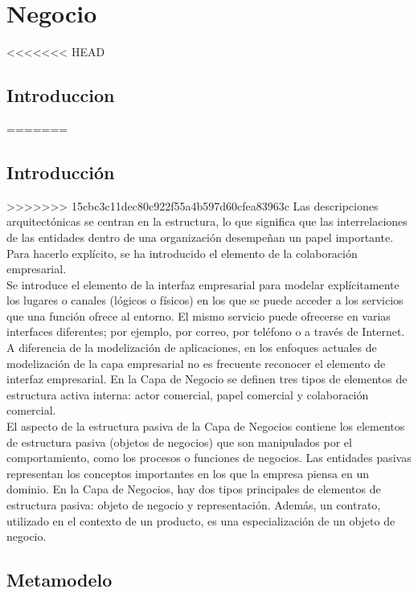 \chapter{Negocio}
<<<<<<< HEAD
\section{Introduccion}
=======
\section{Introducción}
>>>>>>> 15cbc3c11dec80c922f55a4b597d60cfea83963c
Las descripciones arquitectónicas se centran en la estructura, lo que significa que las interrelaciones de las entidades dentro de una organización desempeñan un papel importante. Para hacerlo explícito, se ha introducido el elemento de la colaboración empresarial.\\

Se introduce el elemento de la interfaz empresarial para modelar explícitamente los lugares o canales (lógicos o físicos) en los que se puede acceder a los servicios que una función ofrece al entorno. El mismo servicio puede ofrecerse en varias interfaces diferentes; por ejemplo, por correo, por teléfono o a través de Internet. A diferencia de la modelización de aplicaciones, en los enfoques actuales de modelización de la capa empresarial no es frecuente reconocer el elemento de interfaz empresarial.
En la Capa de Negocio se definen tres tipos de elementos de estructura activa interna: actor comercial, papel comercial y colaboración comercial.\\

El aspecto de la estructura pasiva de la Capa de Negocios contiene los elementos de estructura pasiva (objetos de negocios) que son manipulados por el comportamiento, como los procesos o funciones de negocios. Las entidades pasivas representan los conceptos importantes en los que la empresa piensa en un dominio.
En la Capa de Negocios, hay dos tipos principales de elementos de estructura pasiva: objeto de negocio y representación. Además, un contrato, utilizado en el contexto de un producto, es una especialización de un objeto de negocio.

\newpage
\section{Metamodelo}

